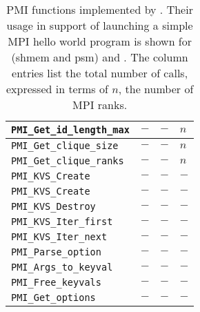 \begin{table}
\begin{tabular}{|p{5cm}|p{3.5cm}|p{3cm}|p{3cm}|}
\hline
{\tt  PMI\_Get\_id\_length\_max} & $-$ & $-$ & $n$ \\
\hline
{\tt  PMI\_Get\_clique\_size} & $-$ & $-$ & $n$ \\
\hline
{\tt  PMI\_Get\_clique\_ranks} & $-$ & $-$ & $n$ \\
\hline
{\tt  PMI\_KVS\_Create} & $-$ & $-$ & $-$ \\
\hline
{\tt  PMI\_KVS\_Create} & $-$ & $-$ & $-$ \\
\hline
{\tt  PMI\_KVS\_Destroy} & $-$ & $-$ & $-$ \\
\hline
{\tt  PMI\_KVS\_Iter\_first} & $-$ & $-$ & $-$ \\
\hline
{\tt  PMI\_KVS\_Iter\_next} & $-$ & $-$ & $-$ \\
\hline
{\tt  PMI\_Parse\_option} & $-$ & $-$ & $-$ \\
\hline
{\tt  PMI\_Args\_to\_keyval} & $-$ & $-$ & $-$ \\
\hline
{\tt  PMI\_Free\_keyvals} & $-$ & $-$ & $-$ \\
\hline
{\tt  PMI\_Get\_options} & $-$ & $-$ & $-$\\
\hline
\end{tabular}
\caption{PMI functions implemented by \slurm.
Their usage in support of launching a simple MPI hello world program
is shown for  (shmem and psm) and \openmpi.
The column entries list the total number of calls,
expressed in terms of $n$, the number of MPI ranks.}
\label{tab:pmiv1}
\end{table}
